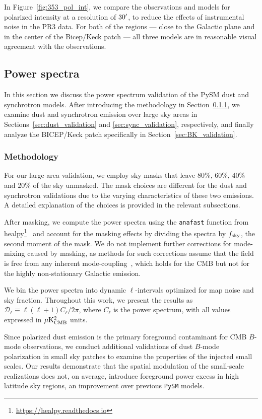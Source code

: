 \documentclass[twocolumn]{aastex631}
\begin{document}
In Figure~\ref{fig:353_pol_int}, we compare the observations and models for polarized intensity at a resolution of $30\mbox{$^\prime$}$, to reduce the effects of instrumental noise in the PR3 data. For both of the regions --- close to the Galactic plane and in the center of the Bicep/Keck patch --- all three models are in reasonable visual agreement with the observations. 

\subsection{Power spectra}
\label{sec:PS-validation}
In this section we discuss the power spectrum validation of the PySM dust and synchrotron models. After introducing the methodology in Section~\ref{subsubsec:methods}, we examine dust and synchrotron emission over large sky areas in Sections~\ref{sec:dust_validation} and \ref{sec:sync_validation}, respectively, and finally analyze the BICEP/Keck patch specifically in Section~\ref{sec:BK_validation}.

\subsubsection{Methodology} \label{subsubsec:methods}
For our large-area validation, we employ sky masks that leave 80\%, 60\%, 40\% and 20\% of the sky unmasked. The mask choices are different for the dust and synchrotron validations due to the varying characteristics of these two emissions. A detailed explanation of the choices is provided in the relevant subsections. 

After masking, we compute the power spectra using the \texttt{anafast} function from healpy\footnote{\url{https://healpy.readthedocs.io}}~\citep{Zonca:2019} and account for the masking effects by dividing the spectra by $f_{\rm sky}$, the second moment of the mask. We do not implement further corrections for mode-mixing caused by masking, as methods for such corrections assume that the field is free from any inherent mode-coupling~\citep[e.g.,][]{Hivon:2002}, which holds for the CMB but not for the highly non-stationary Galactic emission. 

We bin the power spectra into dynamic $\ell$-intervals optimized for map noise and sky fraction. Throughout this work, we present the results as $\mathcal{D}_\ell \equiv \ell(\ell + 1) C_\ell / 2\pi$, where $C_\ell$ is the power spectrum, with all values expressed in $\mu{\rm K^2_{CMB}}$ units. 

Since polarized dust emission is the primary foreground contaminant for CMB $B$-mode observations, we conduct additional validations of dust $B$-mode polarization in small sky patches to examine the properties of the injected small scales. Our results demonstrate that the spatial modulation of the small-scale realizations does not, on average, introduce foreground power excess in high latitude sky regions, an improvement over previous \texttt{PySM} models.
\end{document}
